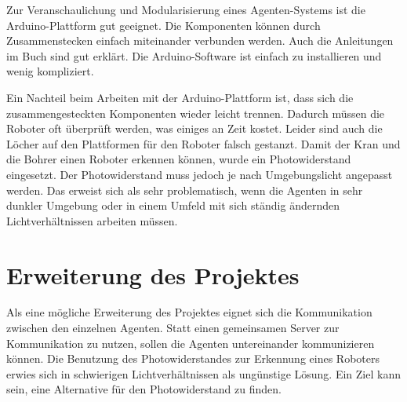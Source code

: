 Zur Veranschaulichung und Modularisierung eines Agenten-Systems ist die Arduino-Plattform gut geeignet. Die Komponenten können durch Zusammenstecken einfach miteinander verbunden werden. Auch die Anleitungen im Buch sind gut erklärt. Die Arduino-Software ist einfach zu installieren und wenig kompliziert.

Ein Nachteil beim Arbeiten mit der Arduino-Plattform ist, dass sich die zusammengesteckten Komponenten wieder leicht trennen. Dadurch müssen die Roboter oft überprüft werden, was einiges an Zeit kostet. Leider sind auch die Löcher auf den Plattformen für den Roboter falsch gestanzt. Damit der Kran und die Bohrer einen Roboter erkennen können, wurde ein Photowiderstand eingesetzt. Der Photowiderstand muss jedoch je nach Umgebungslicht angepasst werden. Das erweist sich als sehr problematisch, wenn die Agenten in sehr dunkler Umgebung oder in einem Umfeld mit sich ständig ändernden Lichtverhältnissen arbeiten müssen.  

\section{Erweiterung des Projektes}

Als eine mögliche Erweiterung des Projektes eignet sich die Kommunikation zwischen den einzelnen Agenten. Statt einen gemeinsamen Server zur Kommunikation zu nutzen, sollen die Agenten untereinander kommunizieren können. Die Benutzung des Photowiderstandes zur Erkennung eines Roboters erwies sich in schwierigen Lichtverhältnissen als ungünstige Lösung. Ein Ziel kann sein, eine Alternative für den Photowiderstand zu finden.
